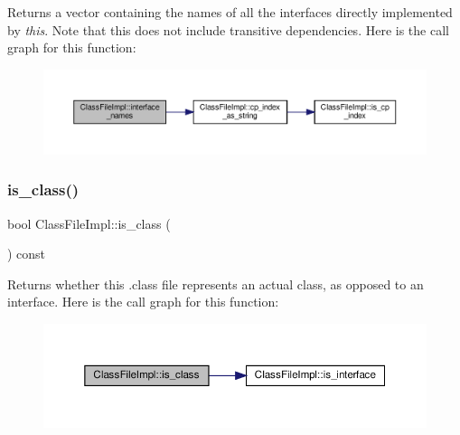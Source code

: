 Returns a vector containing the names of all the interfaces directly implemented by {\itshape this}. Note that this does not include transitive dependencies. Here is the call graph for this function\+:
\nopagebreak
\begin{figure}[H]
\begin{center}
\leavevmode
\includegraphics[width=350pt]{classClassFileImpl_ad2154cb52119b87cd74b722b69730dee_cgraph}
\end{center}
\end{figure}
\mbox{\label{classClassFileImpl_a3772a57b8eaadf252a9a9f36c063ab93}} 
\subsubsection{\texorpdfstring{is\+\_\+class()}{is\_class()}}
{\footnotesize\ttfamily bool Class\+File\+Impl\+::is\+\_\+class (\begin{DoxyParamCaption}{ }\end{DoxyParamCaption}) const}

Returns whether this .class file represents an actual class, as opposed to an interface. Here is the call graph for this function\+:
\nopagebreak
\begin{figure}[H]
\begin{center}
\leavevmode
\includegraphics[width=350pt]{classClassFileImpl_a3772a57b8eaadf252a9a9f36c063ab93_cgraph}
\end{center}
\end{figure}
\mbox{\label{classClassFileImpl_a1f15226f5107cb036e81d480531cda08}} 
